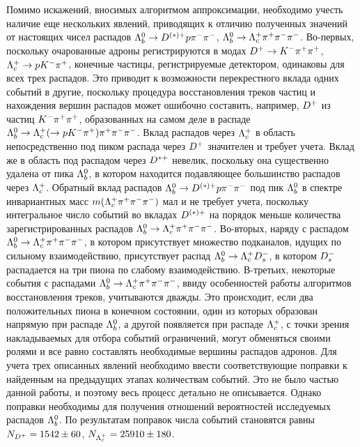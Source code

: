Помимо искажений, вносимых алгоритмом аппроксимации, необходимо учесть 
наличие еще нескольких явлений, приводящих к отличию полученных значений 
от настоящих чисел распадов $\Lb\to\Doptstarp\p\pim\pim$, 
$\Lb\to\Lc\pip\pim\pim$.
%
Во-первых, поскольку очарованные адроны регистрируются в модах 
$\Dp\to\Km\pip\pip$, $\Lc\to\p\Km\pip$, конечные частицы, регистрируемые 
детектором, одинаковы для всех трех распадов. Это приводит к возможности 
перекрестного вклада одних событий в другие, поскольку процедура 
восстановления треков частиц и нахождения вершин распадов может ошибочно 
составить, например, ${D^+}$ из частиц ${K^-}{\pi^+}{\pi^+}$, образованных на 
самом деле в распаде $\Lb\to\Lc(\to\p\Km\pip)\pip\pim\pim$. Вклад 
распадов через ${\Lambda_c^+}$ в область непосредственно под пиком распада через 
${D^+}$ значителен и требует учета. Вклад же в область под распадом через 
${D^{*+}}$ невелик, поскольку она существенно удалена от пика ${\Lambda_b^0}$, 
в котором находится подавляющее большинство распадов через ${\Lambda_c^+}$. 
Обратный вклад распадов $\Lb\to\Doptstarp\p\pim\pim$ под пик ${\Lambda_b^0}$ 
в спектре инвариантных масс $m({\Lambda_c^+}{\pi^+}{\pi^-}{\pi^-})$ мал и не требует учета, 
поскольку интегральное число событий во вкладах ${D^{(*)+}}$ на порядок 
меньше количества зарегистрированных распадов $\Lb\to\Lc\pip\pim\pim$.
%
Во-вторых, наряду с распадом $\Lb\to\Lc\pip\pim\pim$, в котором 
присутствует множество подканалов, идущих по сильному взаимодействию, 
присутствует распад $\Lb\to\Lc\Dsubsm$, в котором ${D_s^-}$ распадается 
на три пиона по слабому взаимодействию.
%
В-третьих, некоторые события с распадами $\Lb\to\Lc\pip\pim\pim$, ввиду 
особенностей работы алгоритмов восстановления треков, учитываются 
дважды. Это происходит, если два положительных пиона в конечном 
состоянии, один из которых образован напрямую при распаде ${\Lambda_b^0}$, 
а другой появляется при распаде ${\Lambda_c^+}$, с точки зрения накладываемых для 
отбора событий ограничений, могут обменяться своими ролями и все равно 
составлять необходимые вершины распадов адронов.
%
Для учета трех описанных явлений необходимо ввести соответствующие 
поправки к найденным на предыдущих этапах количествам событий. Это не 
было частью данной работы, и поэтому весь процесс детально не 
описывается. Однако поправки необходимы для получения отношений 
вероятностей исследуемых распадов ${\Lambda_b^0}$. По результатам поправок числа 
событий становятся равны $N_{D^+} = 1542\pm60$, $N_{\Lambda_c^+} = 25910 \pm 180$.

